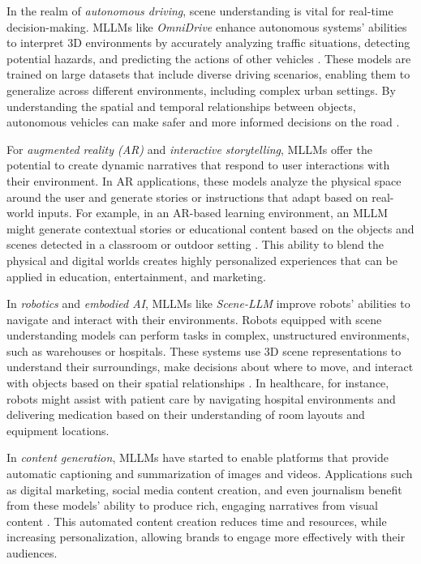 \documentclass{article}
\begin{document}
In the realm of \textit{autonomous driving}, scene understanding is vital for real-time decision-making. MLLMs like \textit{OmniDrive} enhance autonomous systems' abilities to interpret 3D environments by accurately analyzing traffic situations, detecting potential hazards, and predicting the actions of other vehicles \cite{vs2024alvarez}. These models are trained on large datasets that include diverse driving scenarios, enabling them to generalize across different environments, including complex urban settings. By understanding the spatial and temporal relationships between objects, autonomous vehicles can make safer and more informed decisions on the road \cite{vs2024rao}.

For \textit{augmented reality (AR)} and \textit{interactive storytelling}, MLLMs offer the potential to create dynamic narratives that respond to user interactions with their environment. In AR applications, these models analyze the physical space around the user and generate stories or instructions that adapt based on real-world inputs. For example, in an AR-based learning environment, an MLLM might generate contextual stories or educational content based on the objects and scenes detected in a classroom or outdoor setting \cite{vs2019dey}. This ability to blend the physical and digital worlds creates highly personalized experiences that can be applied in education, entertainment, and marketing.

In \textit{robotics} and \textit{embodied AI}, MLLMs like \textit{Scene-LLM} improve robots' abilities to navigate and interact with their environments. Robots equipped with scene understanding models can perform tasks in complex, unstructured environments, such as warehouses or hospitals. These systems use 3D scene representations to understand their surroundings, make decisions about where to move, and interact with objects based on their spatial relationships \cite{vs2024rao}. In healthcare, for instance, robots might assist with patient care by navigating hospital environments and delivering medication based on their understanding of room layouts and equipment locations.

In \textit{content generation}, MLLMs have started to enable platforms that provide automatic captioning and summarization of images and videos. Applications such as digital marketing, social media content creation, and even journalism benefit from these models' ability to produce rich, engaging narratives from visual content \cite{vs2024zang}. This automated content creation reduces time and resources, while increasing personalization, allowing brands to engage more effectively with their audiences.
\end{document}
